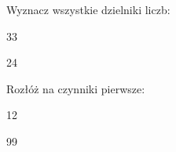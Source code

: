 \documentclass{article}
\begin{document}
\begin{zadanko}
  Wyznacz wszystkie dzielniki liczb:
  
  \begin{podpunkty}
  \item 33
  \item 24
  \end{podpunkty}
\end{zadanko}

\begin{zadanko}
  Rozłóż na czynniki pierwsze:
  
  \begin{podpunkty}
  \item 12
  \item 99
  \end{podpunkty}
\end{zadanko}
\end{document}
